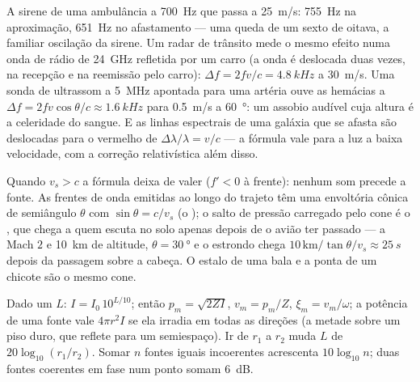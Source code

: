 \begin{example}\label{ex:b2:sound-waves:dopplerex}
A sirene de uma ambulância a \qty{700}{Hz} que passa a \qty{25}{m/s}: \qty{755}{Hz}
na aproximação, \qty{651}{Hz} no afastamento --- uma queda de um sexto de oitava,
a familiar oscilação da sirene. Um radar de trânsito mede o mesmo
efeito numa onda de rádio de \qty{24}{GHz} refletida por um carro (a onda é
deslocada duas vezes, na recepção e na reemissão pelo carro): $\Delta f = 2fv/c =
\qty{4.8}{kHz}$ a \qty{30}{m/s}. Uma sonda de ultrassom a \qty{5}{MHz} apontada para
uma artéria ouve as hemácias a $\Delta f = 2fv\cos\theta/c \approx \qty{1.6}{kHz}$
para \qty{0.5}{m/s} a \qty{60}{\degree}: um assobio audível cuja altura é a
celeridade do sangue. E as linhas espectrais de uma galáxia que se afasta são deslocadas
para o vermelho de $\Delta\lambda/\lambda = v/c$ --- a fórmula vale para a luz a baixa velocidade,
com a correção relativística além disso.
\end{example}

\begin{remark}[Supersônico]\label{rem:b2:sound-waves:mach}
Quando $v_s > c$ a fórmula deixa de valer ($f' < 0$ à frente): nenhum som precede
a fonte. As frentes de onda emitidas ao longo do trajeto têm uma envoltória
cônica de semiângulo $\theta$ com $\sin\theta = c/v_s$ (o \emph{});
o salto de pressão carregado pelo cone é o , que chega a
quem escuta no solo apenas depois de o avião ter passado --- a
Mach $2$ e \qty{10}{km} de altitude, $\theta = \qty{30}{\degree}$ e o estrondo
chega $10\,\text{km}/\tan\theta/v_s \approx \qty{25}{s}$ depois da passagem
sobre a cabeça. O estalo de uma bala e a ponta de um chicote são o mesmo cone.
\end{remark}

\begin{method}\label{met:b2:sound-waves:method}
Dado um  $L$: $I = I_0\,10^{L/10}$; então $p_m = \sqrt{2ZI}$,
$v_m = p_m/Z$, $\xi_m = v_m/\omega$; a potência de uma fonte vale $4\pi r^2I$ se ela
irradia em todas as direções (a metade sobre um piso duro, que
reflete para um semiespaço). Ir de $r_1$ a $r_2$ muda $L$ de
$20\log_{10}(r_1/r_2)$. Somar $n$ fontes iguais incoerentes acrescenta
$10\log_{10}n$; duas fontes coerentes em fase num ponto somam \qty{6}{dB}.
\end{method}

